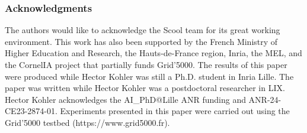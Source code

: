 \documentclass[10pt]{article} %
\theoremstyle{definition}
\begin{document}
\subsubsection*{Acknowledgments}
\label{sec:ack}
The authors would like to acknowledge the Scool team for its great working environment.
This work has also been supported by the French Ministry of Higher Education and Research, the Hauts-de-France region, Inria, the MEL, and the CornelIA project that partially funds Grid'5000.
The results of this paper were produced while Hector Kohler was still a Ph.D. student in Inria Lille. The paper was written while Hector Kohler was a postdoctoral researcher in LIX.
Hector Kohler acknowledges the AI\_PhD@Lille ANR funding and ANR-24-CE23-2874-01. Experiments presented in this paper were carried out using the Grid'5000 testbed (https://www.grid5000.fr).





\beginSupplementaryMaterials

\end{document}

